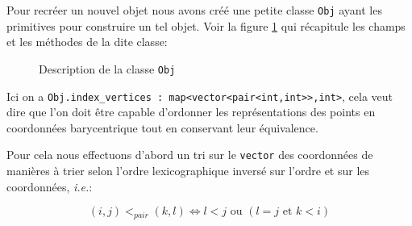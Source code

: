 \documentclass{article}
\begin{document}
Pour recréer un nouvel objet nous avons créé une petite classe \texttt{Obj} ayant les primitives pour construire un tel objet. Voir la figure \ref{fig:objClass} qui récapitule les champs et les méthodes de la dite classe: 
\begin{figure}
\centering
{}
\caption{Description de la classe \texttt{Obj}}
\label{fig:objClass}
\end{figure}

Ici on a \texttt{Obj.index\_vertices : map<vector<pair<int,int>>,int>}, cela veut dire que l'on doit être capable d'ordonner les représentations des points en coordonnées barycentrique tout en conservant leur équivalence.

Pour cela nous effectuons d'abord un tri sur le \texttt{vector} des coordonnées de manières à trier selon l'ordre lexicographique inversé sur l'ordre et sur les coordonnées, \textit{i.e.}:

\begin{equation}
(i,j) <_{pair} (k,l) \Leftrightarrow l < j \textrm{ ou } \left(l=j\textrm{ et } k < i\right)
\end{equation}
\end{document}
